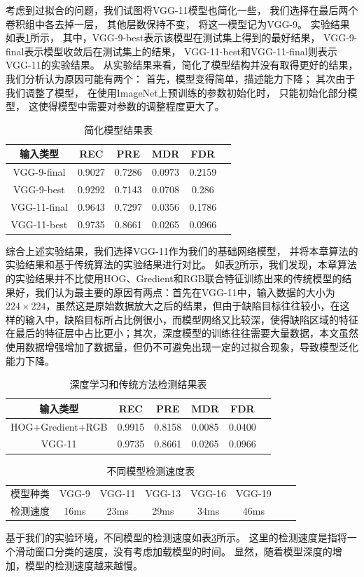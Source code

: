 考虑到过拟合的问题，我们试图将VGG-11模型也简化一些，
我们选择在最后两个卷积组中各去掉一层，
其他层数保持不变，
将这一模型记为VGG-9。
实验结果如表\ref{tab:jianhuajiegou}所示，
其中，VGG-9-best表示该模型在测试集上得到的最好结果，
VGG-9-final表示模型收敛后在测试集上的结果，
VGG-11-best和VGG-11-final则表示VGG-11的实验结果。
从实验结果来看，简化了模型结构并没有取得更好的结果，我们分析认为原因可能有两个：
首先，模型变得简单，描述能力下降；
其次由于我们调整了模型，
在使用ImageNet上预训练的参数初始化时，
只能初始化部分模型，
这使得模型中需要对参数的调整程度更大了。
\begin{table}
\centering
\begin{tabular}{cccccp{38mm}}
\toprule
\textbf{输入类型} & \textbf{REC} & \textbf{PRE} & \textbf{MDR} & \textbf{FDR}\\
\midrule
\mbox{VGG-9-final} & 0.9027 & 0.7286 & 0.0973 & 0.2159\\
\mbox{VGG-9-best} & 0.9292 & 0.7143 & 0.0708 & 0.286\\
\mbox{VGG-11-final} & 0.9643 & 0.7297 & 0.0356 & 0.1786\\
\mbox{VGG-11-best} & 0.9735 & 0.8661 & 0.0265 & 0.0966\\
\bottomrule
\end{tabular}
\caption{简化模型结果表}
\label{tab:jianhuajiegou}
\end{table}
综合上述实验结果，我们选择VGG-11作为我们的基础网络模型，
并将本章算法的实验结果和基于传统算法的实验结果进行对比。
如表\ref{tab:shenduxuexijieguo}所示，我们发现，本章算法的实验结果并不比使用HOG、Gredient和RGB联合特征训练出来的传统模型的结果好，我们认为最主要的原因有两点：首先在VGG-11中，输入数据的大小为$224\times 224$，虽然这是原始数据放大之后的结果，但由于缺陷目标往往较小，在这样的输入中，缺陷目标所占比例很小，而模型网络又比较深，使得缺陷区域的特征在最后的特征层中占比更小；其次，深度模型的训练往往需要大量数据，本文虽然使用数据增强增加了数据量，但仍不可避免出现一定的过拟合现象，导致模型泛化能力下降。
\begin{table}
\centering
\begin{tabular}{cccccp{38mm}}
\toprule
\textbf{输入类型} & \textbf{REC} & \textbf{PRE} & \textbf{MDR} & \textbf{FDR}\\
\midrule
\mbox{HOG+Gredient+RGB} & 0.9915 & 0.8158 & 0.0085 & 0.0400\\
\mbox{VGG-11} & 0.9735 & 0.8661 & 0.0265 & 0.0966\\
\bottomrule
\end{tabular}
\caption{深度学习和传统方法检测结果表}
\label{tab:shenduxuexijieguo}
\end{table}
\begin{table}
\centering
\begin{tabular}{cccccccp{38mm}}
\toprule
\mbox{模型种类} & \mbox{VGG-9} & \mbox{VGG-11} & \mbox{VGG-13} & \mbox{VGG-16} & \mbox{VGG-19}  \\
\mbox{检测速度} & 16ms & 23ms & 29ms & 34ms & 46ms  \\
\bottomrule
\end{tabular}
\caption{不同模型检测速度表}
\label{tab:jiancesudu}
\end{table}
基于我们的实验环境，不同模型的检测速度如表\ref{tab:jiancesudu}所示。
这里的检测速度是指将一个滑动窗口分类的速度，没有考虑加载模型的时间。
显然，随着模型深度的增加，模型的检测速度越来越慢。
